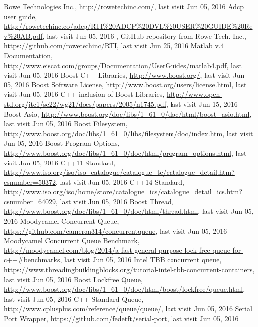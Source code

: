 \begin{thebibliography}{99}

Rowe Technologies Inc., \url{http://rowetechinc.com/}, last visit Jun 05, 2016
Adcp user guide, \url{http://rowetechinc.co/adcp/RTI%20ADCP%20DVL%20USER%20GUIDE%20Rev%20AB.pdf}, last visit Jun 05, 2016
, GitHub repository from Rowe Tech. Inc., \url{https://github.com/rowetechinc/RTI}, last visit Jun 25, 2016
 Matlab v.4 Documentation, \url{http://www.eiscat.com/groups/Documentation/UserGuides/matlab4.pdf}, last visit Jun 05, 2016
 Boost C++ Libraries, \url{http://www.boost.org/}, last visit Jun 05, 2016
 Boost Software License, \url{http://www.boost.org/users/license.html}, last visit Jun 05, 2016
 C++ inclusion of Boost Libraries, \url{http://www.open-std.org/jtc1/sc22/wg21/docs/papers/2005/n1745.pdf}, last visit Jun 15, 2016
 Boost Asio, \url{http://www.boost.org/doc/libs/1\_61\_0/doc/html/boost\_asio.html}, last visit Jun 05, 2016
 Boost Filesystem, \url{http://www.boost.org/doc/libs/1\_61\_0/libs/filesystem/doc/index.htm}, last visit Jun 05, 2016
 Boost Program Options, \url{http://www.boost.org/doc/libs/1\_61\_0/doc/html/program\_options.html}, last visit Jun 05, 2016
C++11 Standard, \url{http://www.iso.org/iso/iso_catalogue/catalogue_tc/catalogue_detail.htm?csnumber=50372}, last visit Jun 05, 2016
C++14 Standard, \url{http://www.iso.org/iso/home/store/catalogue_ics/catalogue_detail_ics.htm?csnumber=64029}, last visit Jun 05, 2016
 Boost Thread, \url{http://www.boost.org/doc/libs/1\_61\_0/doc/html/thread.html}, last visit Jun 05, 2016
 Moodycamel Concurrent Queue, \url{https://github.com/cameron314/concurrentqueue}, last visit Jun 05, 2016
 Moodycamel Concurrent Queue Benchmark, \url{http://moodycamel.com/blog/2014/a-fast-general-purpose-lock-free-queue-for-c++#benchmarks}, last visit Jun 05, 2016
 Intel TBB concurrent queue, \url{https://www.threadingbuildingblocks.org/tutorial-intel-tbb-concurrent-containers}, last visit Jun 05, 2016
 Boost Lockfree Queue, \url{http://www.boost.org/doc/libs/1_61_0/doc/html/boost/lockfree/queue.html}, last visit Jun 05, 2016
 C++ Standard Queue, \url{http://www.cplusplus.com/reference/queue/queue/}, last visit Jun 05, 2016
Serial Port Wrapper, \url{https://github.com/fedetft/serial-port}, last visit Jun 05, 2016

\end{thebibliography}
